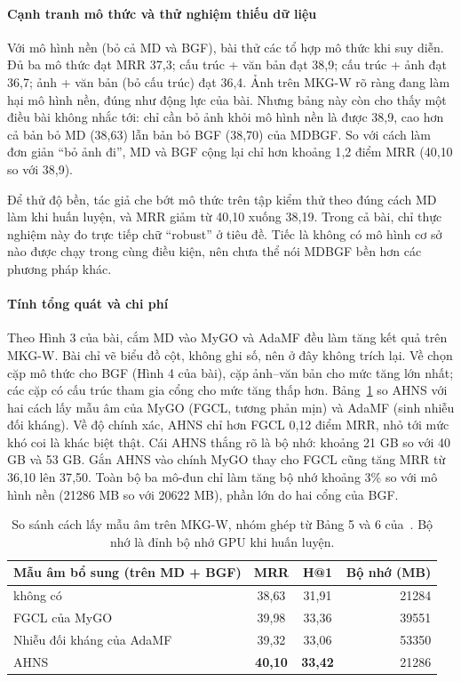 \documentclass[conference,a4paper]{IEEEtran}
\begin{document}
\paragraph{Cạnh tranh mô thức và thử nghiệm thiếu dữ liệu} Với mô hình nền (bỏ cả MD và BGF), bài thử các tổ hợp mô thức khi suy diễn. Đủ ba mô thức đạt MRR 37{,}3; cấu trúc + văn bản đạt 38{,}9; cấu trúc + ảnh đạt 36{,}7; ảnh + văn bản (bỏ cấu trúc) đạt 36{,}4. Ảnh trên MKG-W rõ ràng đang làm hại mô hình nền, đúng như động lực của bài. Nhưng bảng này còn cho thấy một điều bài không nhắc tới: chỉ cần bỏ ảnh khỏi mô hình nền là được 38{,}9, cao hơn cả bản bỏ MD (38{,}63) lẫn bản bỏ BGF (38{,}70) của MDBGF. So với cách làm đơn giản ``bỏ ảnh đi'', MD và BGF cộng lại chỉ hơn khoảng 1{,}2 điểm MRR (40{,}10 so với 38{,}9).

Để thử độ bền, tác giả che bớt mô thức trên tập kiểm thử theo đúng cách MD làm khi huấn luyện, và MRR giảm từ 40{,}10 xuống 38{,}19. Trong cả bài, chỉ thực nghiệm này đo trực tiếp chữ ``robust'' ở tiêu đề. Tiếc là không có mô hình cơ sở nào được chạy trong cùng điều kiện, nên chưa thể nói MDBGF bền hơn các phương pháp khác.

\paragraph{Tính tổng quát và chi phí} Theo Hình 3 của bài, cắm MD vào MyGO và AdaMF đều làm tăng kết quả trên MKG-W. Bài chỉ vẽ biểu đồ cột, không ghi số, nên ở đây không trích lại. Về chọn cặp mô thức cho BGF (Hình 4 của bài), cặp ảnh--văn bản cho mức tăng lớn nhất; các cặp có cấu trúc tham gia cổng cho mức tăng thấp hơn. Bảng~\ref{tab:mdbgf-neg} so AHNS với hai cách lấy mẫu âm của MyGO (FGCL, tương phản mịn) và AdaMF (sinh nhiễu đối kháng). Về độ chính xác, AHNS chỉ hơn FGCL 0{,}12 điểm MRR, nhỏ tới mức khó coi là khác biệt thật. Cái AHNS thắng rõ là bộ nhớ: khoảng 21 GB so với 40 GB và 53 GB. Gắn AHNS vào chính MyGO thay cho FGCL cũng tăng MRR từ 36{,}10 lên 37{,}50. Toàn bộ ba mô-đun chỉ làm tăng bộ nhớ khoảng 3\% so với mô hình nền (21286 MB so với 20622 MB), phần lớn do hai cổng của BGF.

\begin{table}[t]
\centering
\caption{So sánh cách lấy mẫu âm trên MKG-W, nhóm ghép từ Bảng 5 và 6 của~\cite{mdbgf}. Bộ nhớ là đỉnh bộ nhớ GPU khi huấn luyện.}
\label{tab:mdbgf-neg}
\footnotesize
\setlength{\tabcolsep}{4pt}
\begin{tabular}{l cc r}
\toprule
Mẫu âm bổ sung (trên MD + BGF) & MRR & H@1 & Bộ nhớ (MB)\\
\midrule
không có                       & 38{,}63 & 31{,}91 & 21284\\
FGCL của MyGO~\cite{mygo}      & 39{,}98 & 33{,}36 & 39551\\
Nhiễu đối kháng của AdaMF~\cite{adamf} & 39{,}32 & 33{,}06 & 53350\\
AHNS                           & \textbf{40{,}10} & \textbf{33{,}42} & 21286\\
\bottomrule
\end{tabular}
\end{table}
\end{document}
